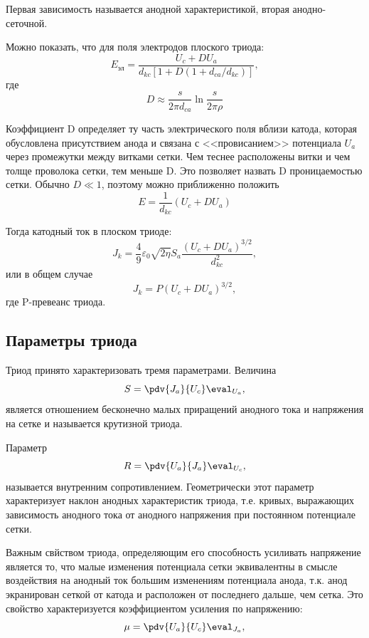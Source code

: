 Первая зависимость называется анодной характеристикой, вторая анодно-сеточной.

Можно показать, что для поля электродов плоского триода:
\begin{equation}
	E_{\text{эл}} = \frac{U_c+DU_a}{d_{kc}[1+D(1+d_{ca}/d_{kc})]},
\end{equation}
где 
\begin{equation}
	D \approx \frac{s}{2\pi d_{ca}}\ln{\frac{s}{2\pi \rho}}
\end{equation}

Коэффициент D определяет ту часть электрического поля вблизи катода, которая
обусловлена присутствием анода и связана с <<провисанием>> потенциала $U_a$ через
промежутки между витками сетки. Чем теснее расположены витки и чем толще
проволока сетки, тем меньше D. Это позволяет назвать D проницаемостью сетки.
Обычно $D \ll 1$, поэтому можно приближенно положить
\begin{equation}
	E = \frac{1}{d_{kc}}(U_c+DU_a)
\end{equation}

Тогда катодный ток в плоском триоде:
\begin{equation}
J_k=\frac49 \varepsilon_0 \sqrt{2 \eta} S_a \frac{(U_c+DU_a)^{3/2}}{d_{kc}^2}, 
\end{equation}
или в общем случае
\begin{equation}
J_k=P(U_c+DU_a)^{3/2}, 
\end{equation}
где  P-превеанс триода.

\subsection{Параметры триода}
Триод принято характеризовать тремя параметрами. Величина
\begin{equation}
	S= \pdv{J_a}{U_c} \eval _{U_a}, 
\end{equation}
является отношением бесконечно малых приращений анодного тока и напряжения на сетке и называется крутизной триода. 

Параметр 
\begin{equation}
	R= \pdv{U_a}{J_a} \eval _{U_c}, 
\end{equation}
называется внутренним сопротивлением. Геометрически этот параметр характеризует наклон анодных характеристик триода,
т.е. кривых, выражающих зависимость анодного тока от анодного напряжения при постоянном потенциале  
сетки.

Важным свйством триода, определяющим его способность усиливать напряжение является то, что малые 
изменения потенциала сетки эквивалентны в смысле воздействия на анодный ток большим изменениям 
потенциала анода, т.к. анод экранирован сеткой от катода и расположен от последнего дальше, 
чем сетка. Это свойство характеризуется коэффициентом усиления по напряжению:
\begin{equation}
	\mu= \pdv{U_a}{U_c} \eval _{J_a}, 
\end{equation}

